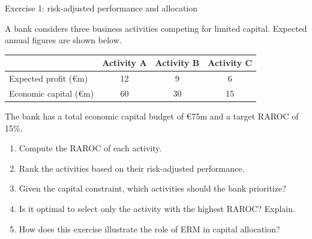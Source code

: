 \documentclass[aspectratio=169, 10pt]{beamer} %
\begin{document}
\begin{frame}{Exercise 1: risk-adjusted performance and allocation}

A bank considers three business activities competing for limited capital.
Expected annual figures are shown below.

\medskip

\centering
\begin{tabular}{lccc}
\hline
 & Activity A & Activity B & Activity C \\
\hline
Expected profit (€m) & 12 & 9 & 6 \\
Economic capital (€m) & 60 & 30 & 15 \\
\hline
\end{tabular}

\medskip

The bank has a total economic capital budget of €75m
and a target RAROC of 15\%.

\begin{enumerate}
  \item Compute the RAROC of each activity.

  \item Rank the activities based on their risk-adjusted performance.

  \item Given the capital constraint, which activities should the bank
  prioritize?

  \item Is it optimal to select only the activity with the highest RAROC?
  Explain.

  \item How does this exercise illustrate the role of ERM in capital allocation?
\end{enumerate}

\end{frame}
\end{document}
